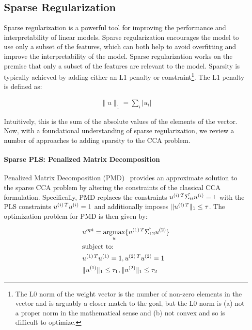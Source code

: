 \subsection{Sparse Regularization}

Sparse regularization is a powerful tool for improving the performance and interpretability of linear models.
Sparse regularization encourages the model to use only a subset of the features, which can both help to avoid overfitting and improve the interpretability of the model.
Sparse regularization works on the premise that only a subset of the features are relevant to the model.
Sparsity is typically achieved by adding either an L1 penalty or constraint\footnote{The L0 norm of the weight vector is the number of non-zero elements in the vector and is arguably a closer match to the goal, but the L0 norm is (a) not a proper norm in the mathematical sense and (b) not convex and so is difficult to optimize.}.
The L1 penalty is defined as:

\begin{align}
    \|u\|_1 = \sum_i |u_i|
\end{align}

Intuitively, this is the sum of the absolute values of the elements of the vector.
Now, with a foundational understanding of sparse regularization, we review a number of approaches to adding sparsity to the CCA problem.

\paragraph{Sparse PLS: Penalized Matrix Decomposition}
Penalized Matrix Decomposition (PMD)~\citep{witten2009penalized} provides an approximate solution to the sparse CCA problem by altering the constraints of the classical CCA formulation.
Specifically, PMD replaces the constraints \(u^{(i)\,T} \hat{\Sigma_{ii}} u^{(i)} = 1\) with the PLS constraints \(u^{(i)\,T} u^{(i)}= 1\) and additionally imposes \(\|u^{(i)\,T}\|_1 \leq \tau\).
The optimization problem for PMD is then given by:

\begin{align}
    & u^{opt}=\underset{u}{\mathrm{argmax}}\{ u^{(1)\,T} \hat{\Sigma_{12}} u^{(2)} \} \\
    & \text{subject to:} \notag \\
    & u^{(1)\,T} u^{(1)} = 1 , u^{(2)\,T} u^{(2)} = 1 \notag \\
    & \|u^{(1)}\|_1 \leq \tau_1 , \|u^{(2)}\|_1 \leq \tau_2 \notag
\end{align}

